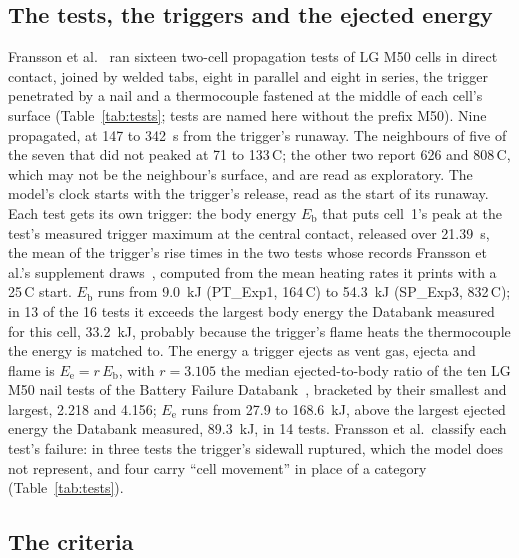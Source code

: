 \documentclass[preprint,12pt]{elsarticle}
\newcommand{\degC}{\,\textdegree C}
\newcommand{\Eb}{E_{\mathrm{b}}}
\newcommand{\Ee}{E_{\mathrm{e}}}
\newcommand{\PH}[1]{\textcolor{red}{[#1]}}
\begin{document}
\subsection{The tests, the triggers and the ejected energy}
\label{sec:tests}

Fransson et al.~\cite{fransson2024exploring} ran sixteen two-cell propagation tests of LG M50 cells in direct contact, joined by welded tabs, eight in parallel and eight in series, the trigger penetrated by a nail and a thermocouple fastened at the middle of each cell's surface (Table~\ref{tab:tests}; tests are named here without the prefix M50). Nine propagated, at 147 to 342~s from the trigger's runaway. The neighbours of five of the seven that did not peaked at 71 to 133\degC; the other two report 626 and 808\degC, which may not be the neighbour's surface, and are read as exploratory. The model's clock starts with the trigger's release, read as the start of its runaway. Each test gets its own trigger: the body energy $\Eb$ that puts cell~1's peak at the test's measured trigger maximum at the central contact, released over 21.39~s, the mean of the trigger's rise times in the two tests whose records Fransson et al.'s supplement draws~\cite{fransson2024exploring}, computed from the mean heating rates it prints with a 25\degC{} start. $\Eb$ runs from 9.0~kJ (PT\_Exp1, 164\degC) to 54.3~kJ (SP\_Exp3, 832\degC); in 13 of the 16 tests it exceeds the largest body energy the Databank measured for this cell, 33.2~kJ, probably because the trigger's flame heats the thermocouple the energy is matched to. The energy a trigger ejects as vent gas, ejecta and flame is $\Ee=r\,\Eb$, with $r=3.105$ the median ejected-to-body ratio of the ten LG M50 nail tests of the Battery Failure Databank~\cite{finegan2024databank}, bracketed by their smallest and largest, 2.218 and 4.156; $\Ee$ runs from 27.9 to 168.6~kJ, above the largest ejected energy the Databank measured, 89.3~kJ, in 14 tests. Fransson et al.\ classify each test's failure: in three tests the trigger's sidewall ruptured, which the model does not represent, and four carry ``cell movement'' in place of a category (Table~\ref{tab:tests}).

\IfFileExists{tables/t1_tests.tex}{}{\PH{table pending}}

\subsection{The criteria}
\label{sec:criteria}
\end{document}
